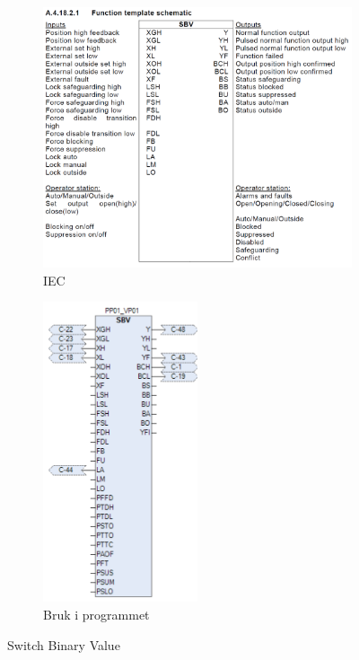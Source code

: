 \begin{figure}[htbp]
    \centering
    \begin{subfigure}[b]{0.45\textwidth}
        \centering
        \includegraphics[width=1\textwidth]{Bilder/SBVBlokkIEC.png}
        \caption{IEC}\label{fig:Switch Binary Value blokk IEC}
    \end{subfigure}
    \hfill
    \begin{subfigure}[b]{0.45\textwidth}
        \centering
        \includegraphics[width=0.5\textwidth]{Bilder/SBVBlokkIProgrammet.png}
        \caption{Bruk i programmet}\label{fig:Switch Binary Value blokk i programmet}
    \end{subfigure}
    \caption{Switch Binary Value}\label{fig:Switch Binary Value}
\end{figure}

